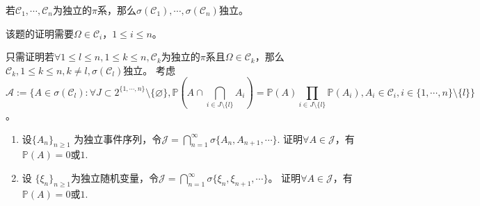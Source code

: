 \documentclass{ctexart}
\begin{document}
\begin{problem}\label{pro:11}
  若\(\mathcal{C}_1,\cdots,\mathcal{C}_n \)为独立的\(\pi \)系，那么\(\sigma(\mathcal{C}_1),\cdots,\sigma(\mathcal{C}_n)\)独立。
\end{problem}
\begin{solution}
  该题的证明需要\(\Omega \in \mathcal{C}_i，1 \leq i \leq n \)。

  只需证明若\(\forall 1 \leq l \leq n,  1 \leq k \leq n, \mathcal{C}_k\)为独立的\(\pi \)系且\(\Omega \in \mathcal{C}_k \)，那么\(\mathcal{C}_k, 1 \leq k \leq n, k \neq l, \sigma(\mathcal{C}_l)  \)独立。
  考虑\[\mathcal{A}:=\{A \in \sigma(\mathcal{C}_l): \forall J \subset 2^{\{1,\cdots,n\}}\setminus \{\varnothing\},\mathbb{P}(A \cap \bigcap_{i \in J \setminus \{l\}}A_i)=\mathbb{P}(A)\prod_{i \in J\setminus\{l\}}\mathbb{P}(A_i), A_i \in \mathcal{C}_i, i \in \{1,\cdots,n\}\setminus\{l\}\} \]。

\end{solution}

\begin{problem}\label{pro:12}
  \begin{enumerate}
    \item 设\(\{A_n\}_{n \geq 1} \) 为独立事件序列，令\(\mathcal{J} = \bigcap_{n=1}^{\infty} \sigma\{A_n,A_{n + 1},\cdots\}. \)
      证明\(\forall A \in \mathcal{J} \)，有\(\mathbb{P} (A) =0 \)或\(1 \).
    \item 设 \(\{\xi_n\}_{n \geq 1} \)为独立随机变量，令\(\mathcal{J} = \bigcap_{n=1}^{\infty} \sigma\{\xi_n,\xi_{n + 1},\cdots\} \)。
      证明\(\forall A \in \mathcal{J} \)，有\(\mathbb{P}(A)=0 \)或\(1 \).
  \end{enumerate}
\end{problem}
\end{document}
